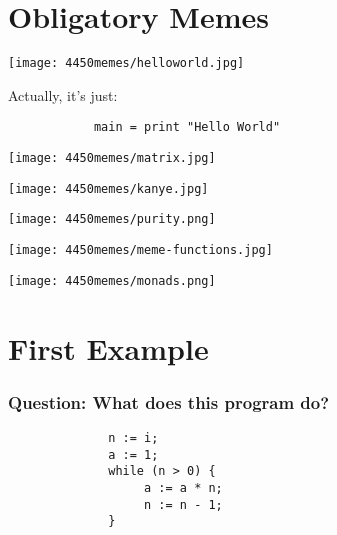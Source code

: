 \documentclass{beamer}
\begin{document}
\section{Obligatory Memes}

\begin{frame}[fragile]
\texttt{[image: 4450memes/helloworld.jpg]}
\pause

Actually, it's just:
\begin{verbatim}
            main = print "Hello World"
\end{verbatim}
\end{frame}

\begin{frame}[fragile]
\begin{center}
\texttt{[image: 4450memes/matrix.jpg]}
\end{center}
\end{frame}

\begin{frame}[fragile]
\begin{center}
\texttt{[image: 4450memes/kanye.jpg]}
\end{center}
\end{frame}

\begin{frame}[fragile]
\begin{center}
\texttt{[image: 4450memes/purity.png]}
\end{center}
\end{frame}

\begin{frame}[fragile]
\begin{center}
\texttt{[image: 4450memes/meme-functions.jpg]}
\end{center}
\end{frame}

\begin{frame}[fragile]
\begin{center}
\texttt{[image: 4450memes/monads.png]}
\end{center}
\end{frame}

\section{First Example}
\begin{frame}[fragile]
    \frametitle{Question: What does this program do? }
    


\begin{verbatim}
              n := i; 
              a := 1; 
              while (n > 0) { 
                   a := a * n; 
                   n := n - 1; 
              }
\end{verbatim}

\end{frame}
\end{document}
